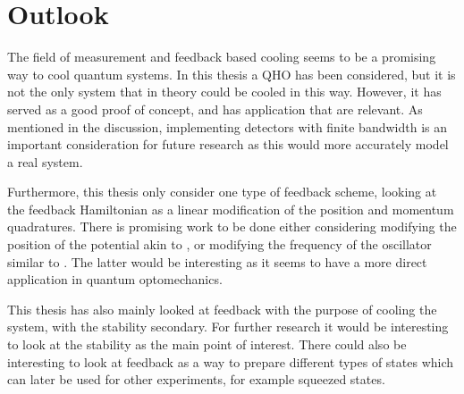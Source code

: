 \section{Outlook}
The field of measurement and feedback based cooling seems to be a promising way to cool quantum systems. In this thesis a QHO has been considered, but it is not the only system that in theory could be cooled in this way. However, it has served as a good proof of concept, and has application that are relevant. As mentioned in the discussion, implementing detectors with finite bandwidth is an important consideration for future research as this would more accurately model a real system. 

Furthermore, this thesis only consider one type of feedback scheme, looking at the feedback Hamiltonian as a linear modification of the position and momentum quadratures. There is promising work to be done either considering modifying the position of the potential akin to \cite{De-Sousa:2025}, or modifying the frequency of the oscillator similar to \cite{Habibi:2016}. The latter would be interesting as it seems to have a more direct application in quantum optomechanics.

This thesis has also mainly looked at feedback with the purpose of cooling the system, with the stability secondary. For further research it would be interesting to look at the stability as the main point of interest. There could also be interesting to look at feedback as a way to prepare different types of states which can later be used for other experiments, for example squeezed states.
